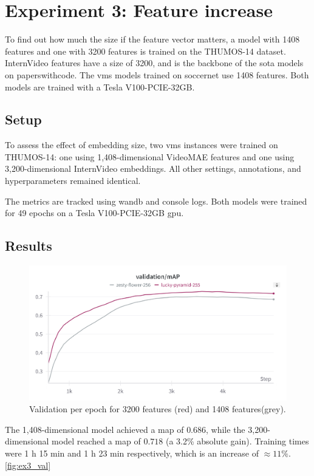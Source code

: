 \section{Experiment 3: Feature increase}
\label{sec:experiment3}
To find out how much the size if the feature vector matters, a model with 1408 features and one with 3200 features is trained on the THUMOS-14 dataset.
InternVideo features have a size of 3200, and is the backbone of the \acrshort{sota} models on paperswithcode. The \acrshort{vms} models trained on soccernet use 1408 features. Both models are trained with a Tesla V100-PCIE-32GB.


\subsection{Setup}
\label{ssec:ex3_setup}

To assess the effect of embedding size, two \acrshort{vms} instances were trained on THUMOS-14\cite{dataset:thumos}: one using 1,408-dimensional VideoMAE features and one using 3,200-dimensional InternVideo embeddings. All other settings, annotations, and hyperparameters remained identical.

The metrics are tracked using \acrlong{wandb} and console logs.
Both models were trained for 49 epochs on a Tesla V100-PCIE-32GB \acrshort{gpu}.

\subsection{Results}
\label{ssec:ex3_results}

\begin{figure}
    \centering
    \includegraphics[width=0.75\linewidth]{figures/1408_3200_val.png}
    \caption{Validation per epoch for 3200 features (red) and 1408 features(grey). }
    \label{fig:ex3_val}
\end{figure}
The 1,408-dimensional model achieved a  \acrshort{map} of \(0.686\), while the 3,200-dimensional model reached a \acrshort{map} of \(0.718\) (a 3.2\% absolute gain). Training times were 1 h 15 min and 1 h 23 min respectively, which is an increase of \(\approx11\%\). \autoref{fig:ex3_val} 


